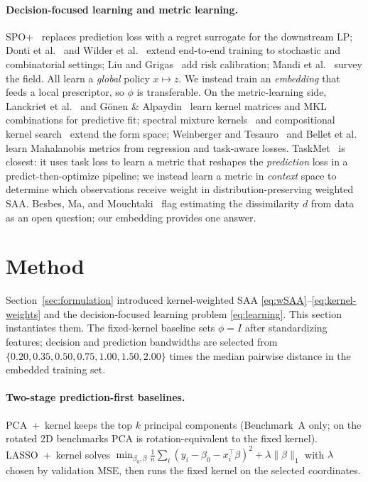 \documentclass[11pt]{article}
\begin{document}
\paragraph{Decision-focused learning and metric learning.}
SPO+~\cite{elmachtoub2022smart} replaces prediction loss with a regret surrogate for the downstream LP; Donti et al.~\cite{donti2017task} and Wilder et al.~\cite{wilder2019melding} extend end-to-end training to stochastic and combinatorial settings; Liu and Grigas~\cite{liu2021risk} add risk calibration; Mandi et al.~\cite{mandi2024decision} survey the field. All learn a \emph{global} policy $x\mapsto z$. We instead train an \emph{embedding} that feeds a local prescriptor, so $\phi$ is transferable. On the metric-learning side, Lanckriet et al.~\cite{lanckriet2004learning} and G\"onen \& Alpaydin~\cite{gonen2011multiple} learn kernel matrices and MKL combinations for predictive fit; spectral mixture kernels~\cite{wilson2013gaussian} and compositional kernel search~\cite{duvenaud2013structure} extend the form space; Weinberger and Tesauro~\cite{weinberger2007metric} and Bellet et al.~\cite{bellet2013survey} learn Mahalanobis metrics from regression and task-aware losses. TaskMet~\cite{bansal2024taskmet} is closest: it uses task loss to learn a metric that reshapes the \emph{prediction} loss in a predict-then-optimize pipeline; we instead learn a metric in \emph{context} space to determine which observations receive weight in distribution-preserving weighted SAA. Besbes, Ma, and Mouchtaki~\cite{besbes2025contextual} flag estimating the dissimilarity $d$ from data as an open question; our embedding provides one answer.

\section{Method}\label{sec:method}

Section~\ref{sec:formulation} introduced kernel-weighted SAA \eqref{eq:wSAA}--\eqref{eq:kernel-weights} and the decision-focused learning problem \eqref{eq:learning}. This section instantiates them. The fixed-kernel baseline sets $\phi=I$ after standardizing features; decision and prediction bandwidths are selected from $\{0.20,0.35,0.50,0.75,1.00,1.50,2.00\}$ times the median pairwise distance in the embedded training set.

\paragraph{Two-stage prediction-first baselines.}
PCA~+~kernel keeps the top $k$ principal components (Benchmark~A only; on the rotated 2D benchmarks PCA is rotation-equivalent to the fixed kernel). LASSO~+~kernel solves $\min_{\beta_0,\beta}\frac{1}{n}\sum_i(y_i-\beta_0-x_i^\top\beta)^2+\lambda\|\beta\|_1$ with $\lambda$ chosen by validation MSE, then runs the fixed kernel on the selected coordinates.
\end{document}
